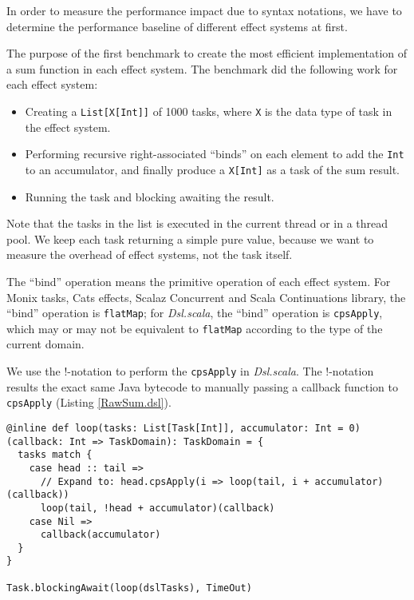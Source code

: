 In order to measure the performance impact due to syntax notations, we have to determine the performance baseline of different effect systems at first.

The purpose of the first benchmark to create the most efficient implementation of a sum function in each effect system. The benchmark did the following work for each effect system:

\begin{itemize}
  \item Creating a \lstinline{List[X[Int]]} of 1000 tasks, where \lstinline{X} is the data type of task in the effect system.
  \item Performing recursive right-associated ``binds'' on each element to add the \lstinline{Int} to an accumulator, and finally produce a \lstinline{X[Int]} as a task of the sum result.
  \item Running the task and blocking awaiting the result.
\end{itemize}

Note that the tasks in the list is executed in the current thread or in a thread pool. We keep each task returning a simple pure value, because we want to measure the overhead of effect systems, not the task itself.

The ``bind'' operation means the primitive operation of each effect system. For Monix tasks, Cats effects, Scalaz Concurrent and Scala Continuations library, the ``bind'' operation is \lstinline{flatMap}; for \textit{Dsl.scala}, the ``bind'' operation is \lstinline{cpsApply}, which may or may not be equivalent to \lstinline{flatMap} according to the type of the current domain.

We use the !-notation to perform the \lstinline{cpsApply} in \textit{Dsl.scala}. The !-notation results the exact same Java bytecode to manually passing a callback function to \lstinline{cpsApply} (Listing \ref{RawSum.dsl}).

\begin{lstlisting}[caption={The most efficient implementation of sum based on CPS function alias},label={RawSum.dsl}]
@inline def loop(tasks: List[Task[Int]], accumulator: Int = 0)(callback: Int => TaskDomain): TaskDomain = {
  tasks match {
    case head :: tail =>
      // Expand to: head.cpsApply(i => loop(tail, i + accumulator)(callback))
      loop(tail, !head + accumulator)(callback)
    case Nil =>
      callback(accumulator)
  }
}

Task.blockingAwait(loop(dslTasks), TimeOut)
\end{lstlisting}

